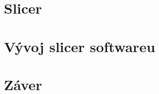\documentclass[10pt,twoside,slovak,a4paper]{article}
\begin{document}
\section{Slicer}

\section{Vývoj slicer softwareu}

\section{Záver}



\cite{1}
\cite{2}
\end{document}
